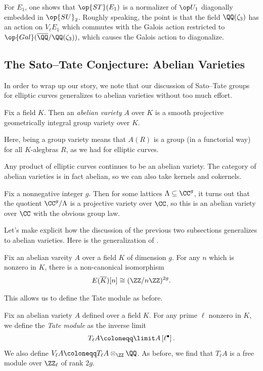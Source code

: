 \documentclass{article}
\begin{document}
\begin{example}
	For $E_1$, one shows that $\op{ST}(E_1)$ is a normalizer of $\op U_1$ diagonally embedded in $\op{SU}_2$. Roughly speaking, the point is that the field $\QQ(\zeta_3)$ has an action on $V_\ell E_1$ which commutes with the Galois action restricted to $\op{Gal}(\overline\QQ/\QQ(\zeta_3))$, which causes the Galois action to diagonalize.
\end{example}

\subsection{The Sato--Tate Conjecture: Abelian Varieties}
In order to wrap up our story, we note that our discussion of Sato--Tate groups for elliptic curves generalizes to abelian varieties without too much effort.
\begin{definition}
	Fix a field $K$. Then an \textit{abelian variety} $A$ over $K$ is a smooth projective geometrically integral group variety over $K$.
\end{definition}
Here, being a group variety means that $A(R)$ is a group (in a functorial way) for all $K$-alegbras $R$, as we had for elliptic curves.
\begin{example}
	Any product of elliptic curves continues to be an abelian variety. The category of abelian varieties is in fact abelian, so we can also take kernels and cokernels.
\end{example}
\begin{example}
	Fix a nonnegative integer $g$. Then for some lattices $\Lambda\subseteq\CC^g$, it turns out that the quotient $\CC^g/\Lambda$ is a projective variety over $\CC$, so this is an abelian variety over $\CC$ with the obvious group law.
\end{example}
Let's make explicit how the discussion of the previous two subsections generalizes to abelian varieties. Here is the generalization of .
\begin{proposition}
	Fix an abelian vareity $A$ over a field $K$ of dimension $g$. For any $n$ which is nonzero in $K$, there is a non-canonical isomorphism
	\[E(\overline K)[n]\cong(\ZZ/n\ZZ)^{2g}.\]
\end{proposition}
This allows us to define the Tate module as before.
\begin{definition}
	Fix an abelian variety $A$ defined over a field $K$. For any prime $\ell$ nonzero in $K$, we define the \textit{Tate module} as the inverse limit
	\[T_\ell A\coloneqq\limit A\left[\ell^\bullet\right].\]
	We also define $V_\ell A\coloneqq T_\ell A\otimes_\ZZ\QQ$. As before, we find that $T_\ell A$ is a free module over $\ZZ_\ell$ of rank $2g$.
\end{definition}
\end{document}
